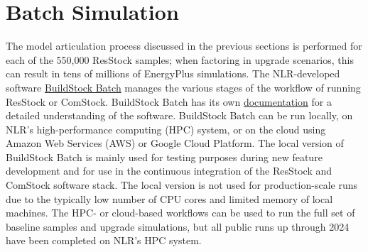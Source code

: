 \section{Batch Simulation}
The model articulation process discussed in the previous sections is performed for each of the 550,000 ResStock samples; when factoring in upgrade scenarios, this can result in tens of millions of EnergyPlus simulations. The NLR-developed software \href{https://github.com/NREL/buildstockbatch/tree/v2023.10.0}{BuildStock Batch} manages the various stages of the workflow of running ResStock or ComStock. BuildStock Batch has its own \href{https://buildstockbatch.readthedocs.io/en/v2023.10.0/index.html}{documentation} for a detailed understanding of the software. BuildStock Batch can be run locally, on NLR's high-performance computing (HPC) system, or on the cloud using Amazon Web Services (AWS) or Google Cloud Platform. The local version of BuildStock Batch is mainly used for testing purposes during new feature development and for use in the continuous integration of the ResStock and ComStock software stack. The local version is not used for production-scale runs due to the typically low number of CPU cores and limited memory of local machines. The HPC- or cloud-based workflows can be used to run the full set of baseline samples and upgrade simulations, but all public runs up through 2024 have been completed on NLR's HPC system.

